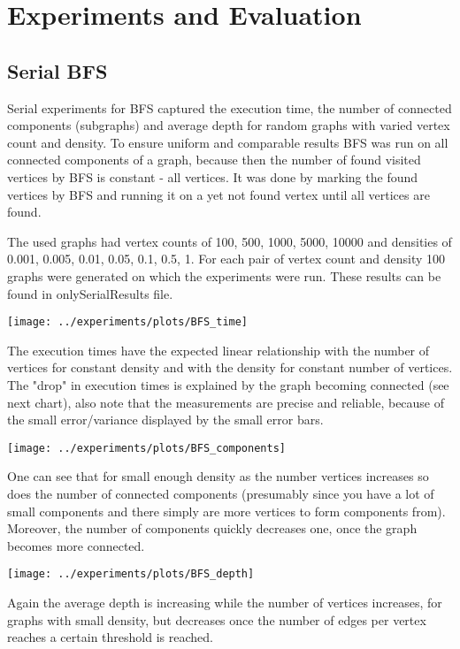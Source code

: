 \documentclass{report}
\theoremstyle{plain}
\theoremstyle{definition}
\theoremstyle{remark}
\begin{document}
\section{Experiments and Evaluation}

\subsection{Serial BFS}

Serial experiments for BFS captured the execution time, the number of connected components (subgraphs) and average depth for random graphs with varied vertex count and density. To ensure uniform and comparable results BFS was run on all connected components of a graph, because then the number of found visited vertices by BFS is constant - all vertices. It was done by marking the found vertices by BFS and running it on a yet not found vertex until all vertices are found.

 The used graphs had vertex counts of 100, 500, 1000, 5000, 10000 and densities of 0.001, 0.005, 0.01, 0.05, 0.1, 0.5, 1. For each pair of vertex count and density 100 graphs were generated on which the experiments were run. These results can be found in onlySerialResults file.

\texttt{[image: ../experiments/plots/BFS\_time]}

The execution times have the expected linear relationship with the number of vertices for constant density and with the density for constant number of vertices. The "drop" in execution times is explained by the graph becoming connected (see next chart), also note that the measurements are precise and reliable, because of the small error/variance displayed by the small error bars.

\texttt{[image: ../experiments/plots/BFS\_components]}

One can see that for small enough density as the number vertices increases so does the number of connected components (presumably since you have a lot of small components and there simply are more vertices to form components from). Moreover, the number of components quickly decreases one, once the graph becomes more connected. 

\texttt{[image: ../experiments/plots/BFS\_depth]}

Again the average depth is increasing while the number of vertices increases, for graphs with small density, but decreases once the number of edges per vertex reaches a certain threshold is reached.
\end{document}
